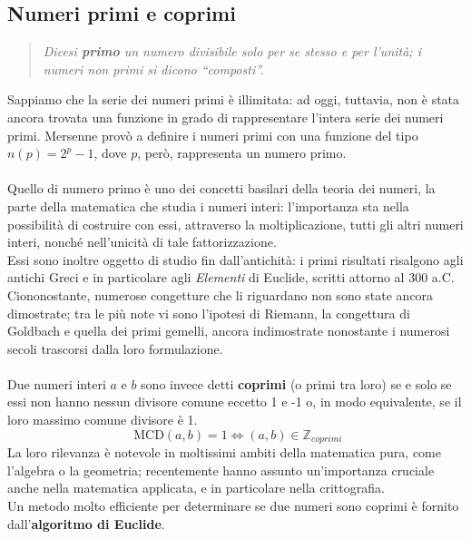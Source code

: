 \subsection{Numeri primi e coprimi}
\begin{quote}
    \emph{Dicesi \textbf{primo} un numero divisibile solo per se stesso e per l'unità; i numeri non primi si dicono ``composti''.}
\end{quote}
Sappiamo che la serie dei numeri primi è illimitata: ad oggi, tuttavia, non è stata ancora trovata una funzione in grado di rappresentare l'intera serie dei numeri primi. Mersenne provò a definire i numeri primi con una funzione del tipo $n(p) = 2^{p}-1$, dove $p$, però, rappresenta un numero primo.\\\\
Quello di numero primo è uno dei concetti basilari della teoria dei numeri, la parte della matematica che studia i numeri interi: l'importanza sta nella possibilità di costruire con essi, attraverso la moltiplicazione, tutti gli altri numeri interi, nonché nell'unicità di tale fattorizzazione.\\
Essi sono inoltre oggetto di studio fin dall'antichità: i primi risultati risalgono agli antichi Greci e in particolare agli \emph{Elementi} di Euclide, scritti attorno al 300 a.C. Ciononostante, numerose congetture che li riguardano non sono state ancora dimostrate; tra le più note vi sono l'ipotesi di Riemann, la congettura di Goldbach e quella dei primi gemelli, ancora indimostrate nonostante i numerosi secoli trascorsi dalla loro formulazione.\\\\
Due numeri interi $a$ e $b$ sono invece detti \textbf{coprimi} (o primi tra loro) se e solo se essi non hanno nessun divisore comune eccetto 1 e -1 o, in modo equivalente, se il loro massimo comune divisore è 1.
\begin{equation}\label{coprimi}
\text{ MCD}(a,b)=1 \iff (a,b) \in \mathbb{Z}_{coprimi}
\end{equation}
La loro rilevanza è notevole in moltissimi ambiti della matematica pura, come l'algebra o la geometria; recentemente hanno assunto un'importanza cruciale anche nella matematica applicata, e in particolare nella crittografia.\\
Un metodo molto efficiente per determinare se due numeri sono coprimi è fornito dall'\textbf{algoritmo di Euclide}.
